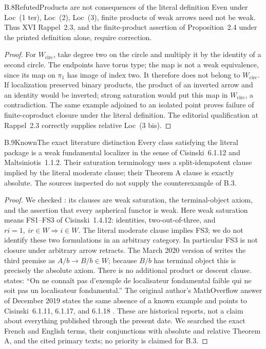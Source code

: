 \begin{claim}{B.8}{Refuted}{Products are not consequences of the literal definition}
Even under Loc~(1 ter), Loc~(2), Loc~(3), finite products of weak arrows
need not be weak. Thus XVI Rappel~2.3, and the finite-product assertion
of Proposition~2.4 under the printed definition alone, require correction.
\end{claim}
\begin{proof}
For $W_{\mathrm{circ}}$, take degree two on the circle and multiply it
by the identity of a second circle. The endpoints have torus type; the
map is not a weak equivalence, since its map on $\pi _1$ has image of
index two. It therefore does not belong to $W_{\mathrm{circ}}$.
If localization preserved binary products, the product of an inverted
arrow and an identity would be inverted; strong saturation would put
this map in $W_{\mathrm{circ}}$, a contradiction. The same example
adjoined to an isolated point proves failure of finite-coproduct
closure under the literal definition. The editorial qualification at
Rappel~2.3 correctly supplies relative Loc~(3 bis).
\end{proof}

\begin{claim}{B.9}{Known}{The exact literature distinction}
Every class satisfying the literal package is a weak fundamental
localizer in the sense of Cisinski~6.1.12 and Maltsiniotis~1.1.2.
Their saturation terminology uses a split-idempotent clause implied
by the literal moderate clause; their Theorem A clause is exactly
absolute. The sources inspected do not supply the counterexample of B.3.
\end{claim}
\begin{proof}
We checked \citet[\S6.1.12]{RESCisinski2006}: its clauses are weak
saturation, the terminal-object axiom, and the assertion that every
aspherical functor is weak. Here weak saturation means FS1--FS3 of
Cisinski~1.4.12: identities, two-out-of-three, and
$ri=1,\ ir\in W\Rightarrow i\in W$. The literal moderate clause
implies FS3; we do not identify these two formulations in an arbitrary
category. In particular FS3 is not closure under arbitrary arrow
retracts. The March 2020 version of
\citet[\S1.1.2]{RESMalts2020} writes the third premise as
$A/b\to B/b\in W$; because $B/b$ has terminal object this is precisely
the absolute axiom. There is no additional product or descent clause.
\citet[Remark~1.3]{RESMalts2012} states:
``On ne conna\^it pas d'exemple de localisateur fondamental faible qui ne
soit pas un localisateur fondamental.'' The original author's
MathOverflow answer of December 2019 states the same absence of a known
example and points to Cisinski~6.1.11, 6.1.17, and 6.1.18
\citep{RESCisinski2019MO}. These are historical reports, not a claim about
everything published through the present date. We searched the exact
French and English terms, their conjunctions with absolute and relative
Theorem A, and the cited primary texts; no priority is claimed for B.3.
\end{proof}

